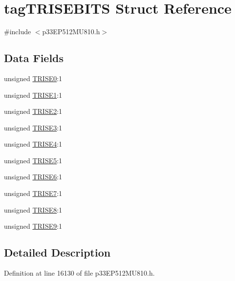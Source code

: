 \hypertarget{structtag_t_r_i_s_e_b_i_t_s}{}\section{tag\+T\+R\+I\+S\+E\+B\+I\+TS Struct Reference}
\label{structtag_t_r_i_s_e_b_i_t_s}


{\ttfamily \#include $<$p33\+E\+P512\+M\+U810.\+h$>$}

\subsection*{Data Fields}
\begin{DoxyCompactItemize}
\item 
unsigned \hyperlink{structtag_t_r_i_s_e_b_i_t_s_a4fde13ebb8ce91c1855d437b3e8721a1}{T\+R\+I\+S\+E0}\+:1
\item 
unsigned \hyperlink{structtag_t_r_i_s_e_b_i_t_s_ae3d523ca365d9db6485d2634660389fc}{T\+R\+I\+S\+E1}\+:1
\item 
unsigned \hyperlink{structtag_t_r_i_s_e_b_i_t_s_a9d223c63060ea30dfffa6cdb497772d8}{T\+R\+I\+S\+E2}\+:1
\item 
unsigned \hyperlink{structtag_t_r_i_s_e_b_i_t_s_a438a3a9550d6470fb8ea3ec8a61cec9d}{T\+R\+I\+S\+E3}\+:1
\item 
unsigned \hyperlink{structtag_t_r_i_s_e_b_i_t_s_a618a0133c9f503ce2afe825fe70a2c55}{T\+R\+I\+S\+E4}\+:1
\item 
unsigned \hyperlink{structtag_t_r_i_s_e_b_i_t_s_a1a3c43832c62f2d238db4a270307b02b}{T\+R\+I\+S\+E5}\+:1
\item 
unsigned \hyperlink{structtag_t_r_i_s_e_b_i_t_s_a2d20a7efc9bd2ed952b663052a9ca384}{T\+R\+I\+S\+E6}\+:1
\item 
unsigned \hyperlink{structtag_t_r_i_s_e_b_i_t_s_a2d7d9f93d9f8fb115476c18c8493fdfc}{T\+R\+I\+S\+E7}\+:1
\item 
unsigned \hyperlink{structtag_t_r_i_s_e_b_i_t_s_a43d8ab47fb27f479f643f088b5042214}{T\+R\+I\+S\+E8}\+:1
\item 
unsigned \hyperlink{structtag_t_r_i_s_e_b_i_t_s_aafc56ea643ddfb4897094b153c117587}{T\+R\+I\+S\+E9}\+:1
\end{DoxyCompactItemize}


\subsection{Detailed Description}


Definition at line 16130 of file p33\+E\+P512\+M\+U810.\+h.



